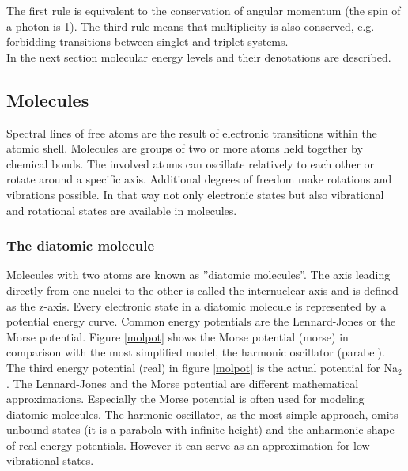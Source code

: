 \documentclass[parskip,12pt,headsepline,a4paper] {scrbook}
\begin{document}
The first rule is equivalent to the conservation of angular momentum (the spin of a photon is 1). The third rule means that multiplicity is also conserved, e.g. forbidding transitions between singlet and triplet systems. \\

In the next section molecular energy levels and their denotations are described.


\subsection{Molecules}
\vspace{-1\baselineskip}
Spectral lines of free atoms are the result of electronic transitions within the atomic shell. Molecules are groups of two or more atoms held together by chemical bonds. The involved atoms can oscillate relatively to each other or rotate around a specific axis. Additional degrees of freedom make rotations and vibrations possible. In that way not only electronic states but also vibrational and rotational states are available in molecules. \\

\subsubsection{The diatomic molecule}
\vspace{-1\baselineskip}
Molecules with two atoms are known as ''diatomic molecules''. The axis leading directly from one nuclei to the other is called the internuclear axis and is defined as the z-axis. Every electronic state in a diatomic molecule is represented by a potential energy curve. Common energy potentials are the Lennard-Jones or the Morse potential. Figure \ref{molpot} shows the Morse potential (morse) in comparison with the most simplified model, the harmonic oscillator (parabel). The third energy potential (real) in figure \ref{molpot} is the actual potential for Na$_2$.
The Lennard-Jones and the Morse potential are different mathematical approximations. Especially the Morse potential is often used for modeling diatomic molecules. The harmonic oscillator, as the most simple approach, omits unbound states (it is a parabola with infinite height) and the anharmonic shape of real energy potentials. However it can serve as an approximation for low vibrational states.
\end{document}
